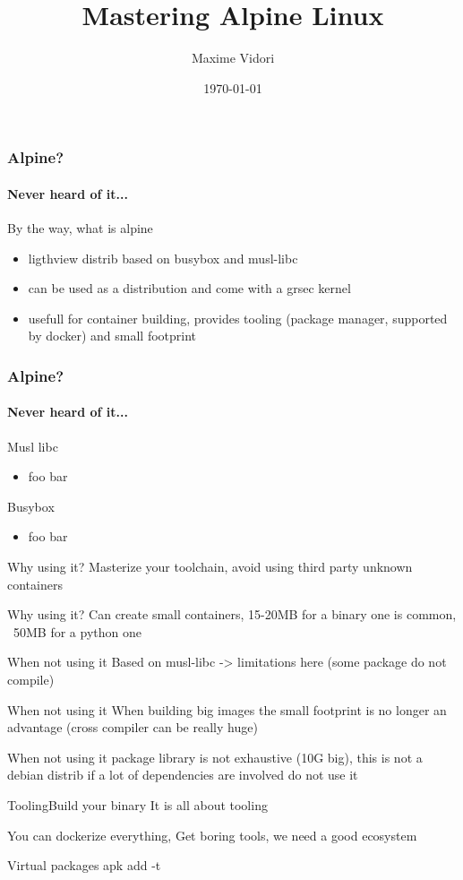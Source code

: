 \documentclass{beamer}
\title{Mastering Alpine Linux}
\date{\today}
\author{Maxime Vidori}
\begin{document}
\begin{frame}
  \titlepage
\end{frame}


\begin{frame}
  \frametitle{Alpine?}
  \framesubtitle{Never heard of it...}
  By the way, what is alpine
  \begin{itemize}
    \item ligthview distrib based on busybox and musl-libc
    \item can be used as a distribution and come with a grsec kernel
    \item usefull for container building, provides tooling
      (package manager, supported by docker) and small footprint
  \end{itemize}
\end{frame}

\begin{frame}
  \frametitle{Alpine?}
  \framesubtitle{Never heard of it...}
  Musl libc
  \begin{itemize}
    \item foo bar
  \end{itemize}
  Busybox
  \begin{itemize}
    \item foo bar
  \end{itemize}
\end{frame}

\begin{frame}{Why using it?}
  Masterize your toolchain, avoid using third party unknown containers
\end{frame}

\begin{frame}{Why using it?}
  Can create small containers, 15-20MB for a binary one is common,
    ~50MB for a python one
\end{frame}

\begin{frame}{When not using it}
  Based on musl-libc -> limitations here (some package do not compile)
\end{frame}

\begin{frame}{When not using it}
  When building big images the small footprint is no longer an advantage
    (cross compiler can be really huge)
\end{frame}

\begin{frame}{When not using it}
  package library is not exhaustive (10G big), this is not a debian distrib
    if a lot of dependencies are involved do not use it
\end{frame}
\begin{frame}{Tooling}{Build your binary}
 It is all about tooling

  You can dockerize everything,
  Get boring tools, we need a good ecosystem

  Virtual packages
  apk add -t
\end{frame}
\end{document}
